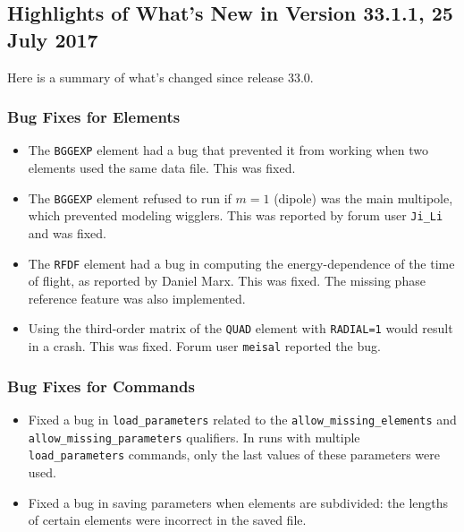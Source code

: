 \documentclass[11pt]{article}
\begin{document}
\subsection{Highlights of What's New in Version 33.1.1, 25 July 2017}

Here is a summary of what's changed since release 33.0.

\subsubsection{Bug Fixes for Elements}

\begin{itemize}
\item The \verb|BGGEXP| element had a bug that prevented it from working when two elements
  used the same data file. This was fixed.
\item The \verb|BGGEXP| element refused to run if $m=1$ (dipole) was the main multipole, which
  prevented modeling wigglers. This was reported by forum user \verb|Ji_Li| and was fixed.
\item The \verb|RFDF| element had a bug in computing the energy-dependence of the time of flight,
  as reported by Daniel Marx. This was fixed. The missing phase reference feature was also implemented.
\item Using the third-order matrix of the \verb|QUAD| element with \verb|RADIAL=1| would result in a crash.
  This was fixed. Forum user \verb|meisal| reported the bug.
\end{itemize}

\subsubsection{Bug Fixes for Commands}
\begin{itemize}
\item Fixed a bug in \verb|load_parameters| related to the \verb|allow_missing_elements| and \\ \verb|allow_missing_parameters|
  qualifiers. In runs with multiple \verb|load_parameters| commands, only the last values of these parameters were used.
\item Fixed a bug in saving parameters when elements are subdivided: the lengths of certain elements were incorrect in
  the saved file.
\end{itemize}
\end{document}
